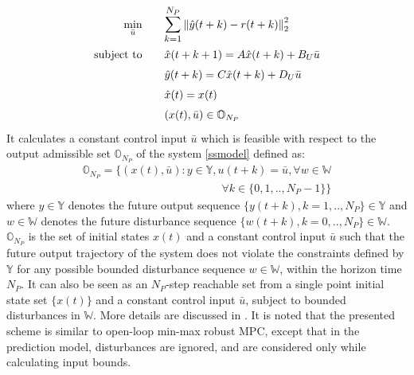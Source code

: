 \documentclass[letterpaper, 10 pt, conference]{ieeeconf}  %
\newcommand{\norm}[1]{\left\lVert#1\right\rVert}
\newcommand{\AB}[1]{\textbf{\color{magenta}{[AB: #1]}}}
\begin{document}
  	\begin{equation}
  	\small
  	\begin{aligned}
  	\underset{\bar{u}}{\text{min}}
  	&  \hspace{20pt} \mathlarger{\sum\limits_{k=1}^{N_P}}\norm{\hat y(t+k)-r(t+k)}_2^2 \\
  	\text{subject to}
  	& \hspace{20pt} \hat{x}(t+k+1) = A\hat{x}(t+k) + B_U\bar{u}\\
  	& \hspace{20pt} \hat y(t+k) = C\hat{x}(t+k) + D_U\bar{u} \\
  	& \hspace{20pt} \hat{x}(t)=x(t) \\
  	& \hspace{20pt} (x(t),\bar{u}) \in \mathbb{O}_{N_P}
  	\end{aligned}
  	\label{RMPC}
  	\end{equation}
  It calculates a constant control input $\bar{u}$ which is feasible with respect to the output admissible set $\mathbb{O}_{N_P}$ of the system \eqref{ssmodel} defined as:
  \begin{equation}
  \begin{matrix}
  \mathbb{O}_{N_P} = \{(x(t),\bar{u}):y\in \mathbb{Y}, u(t+k)=\bar{u},\forall w \in \mathbb{W}  \\ \hspace{150pt} \forall k \in \{0,1,..,N_P-1\} \}
  \end{matrix}
  \label{O_form}
  \end{equation}
  where $y \in \mathbb{Y}$ denotes the future output sequence $\{y(t+k),k=1,..,N_P\}\in\mathbb{Y}$
  and $w \in \mathbb{W}$ denotes the future disturbance sequence $\{w(t+k),k=0,..,N_P\}\in\mathbb{W}$.
  $\mathbb{O}_{N_P}$ is the set of initial states $x(t)$ and a constant control input $\bar{u}$ such that the future output trajectory of the system does not violate the constraints defined by $\mathbb{Y}$ for any possible bounded disturbance sequence $w\in\mathbb{W}$, within the horizon time $N_P$. It can also be seen as an $N_P$-step reachable set from a single point initial state set $\{x(t)\}$ and a constant control input $\bar{u}$, subject to bounded disturbances in $\mathbb{W}$. More details are discussed in \cite{Predictivecontrol}. It is noted that the presented scheme is similar to open-loop min-max robust MPC, except that in the prediction model, disturbances are ignored, and are considered only while calculating input bounds.
\end{document}
